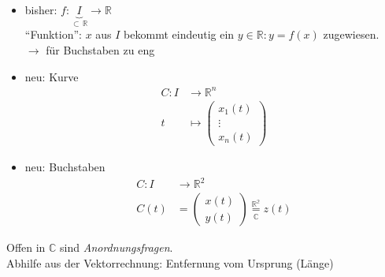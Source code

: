 \begin{note}[Achtung!]\flush

  \begin{itemize}
    \item bisher: $f: \underbrace{I}_{\subset \, \mathbb{R}} \longrightarrow \mathbb{R}$ \\
      "`Funktion"': $x$ aus $I$ bekommt eindeutig ein $y\in \mathbb{R}: y=f(x)$ zugewiesen.\\
      $\rightarrow$ für Buchstaben zu eng
    \item neu: Kurve
      \begin{align*}
      C:I & \longrightarrow \mathbb{R}^n \\
      t & \longmapsto \begin{pmatrix}x_1(t) \\ \vdots \\ x_n(t)\end{pmatrix}
      \end{align*}
    \item neu: Buchstaben
      \begin{align*}
      C:I & \longrightarrow \mathbb{R}^2 \\
      C(t) & = \begin{pmatrix}x(t) \\ y(t)\end{pmatrix} \underset{\mathbb{C}}{\overset{\mathbb{R^2}}{=}} z(t)
      \end{align*}
  \end{itemize}

\end{note}
%
\noindent Offen in $\mathbb{C}$ sind  \emph{Anordnungsfragen}.\\
Abhilfe aus der Vektorrechnung: Entfernung vom Ursprung (Länge)

